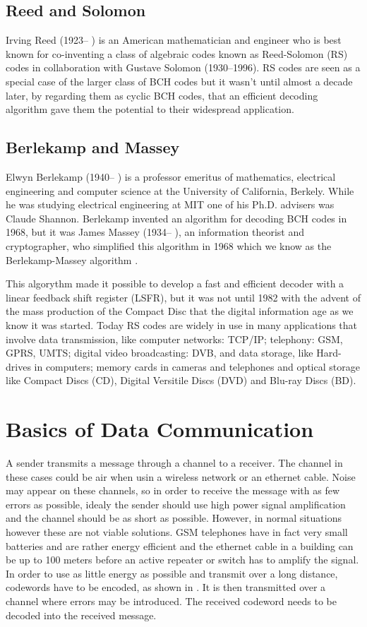 \documentclass[../main.tex]{subfiles}
\begin{document}
    \subsection{Reed and Solomon}
    Irving Reed (1923– ) is an American mathematician and engineer who is best known for co-inventing a class of algebraic codes known as Reed-Solomon (RS) codes in collaboration with Gustave Solomon (1930–1996). RS codes are seen as a special case of the larger class of BCH codes but it wasn't until almost a decade later, by regarding them as cyclic BCH codes, that an efficient decoding algorithm gave them the potential to their widespread application.


    \subsection{Berlekamp and Massey}
    Elwyn Berlekamp (1940– ) is a professor emeritus of mathematics, electrical engineering and computer science at the University of California, Berkely. While he was studying electrical engineering at MIT one of his Ph.D. advisers was Claude Shannon. Berlekamp invented an algorithm for decoding BCH codes in 1968, but it was James Massey (1934– ), an information theorist and cryptographer, who simplified this algorithm in 1968 which we know as the Berlekamp-Massey algorithm \autocite{massey1969shift}.

        This algorythm made it possible to develop a fast and efficient decoder with a linear feedback shift register (LSFR), but it was not until 1982 with the advent of the mass production of the Compact Disc that the digital information age as we know it was started. Today RS codes are widely in use in many applications that involve data transmission, like computer networks: TCP/IP; telephony: GSM, GPRS, UMTS; digital video broadcasting: DVB, and data storage, like Hard-drives in computers; memory cards in cameras and telephones and optical storage like Compact Discs (CD), Digital Versitile Discs (DVD) and Blu-ray Discs (BD).


    \section{Basics of Data Communication}
    A sender transmits a message through a channel to a receiver. The channel in these cases could be air when usin a wireless network or an ethernet cable. Noise may appear on these channels, so in order to receive the message with as few errors as possible, idealy the sender should use high power signal amplification and the channel should be as short as possible. However, in normal situations however these are not viable solutions. GSM telephones have in fact very small batteries and are rather energy efficient and the ethernet cable in a building can be up to 100 meters before an active repeater or switch has to amplify the signal. In order to use as little energy as possible and transmit over a long distance, codewords have to be encoded, as shown in . It is then transmitted over a channel where errors may be introduced. The received codeword needs to be decoded into the received message.
\end{document}
